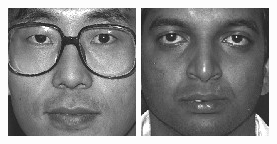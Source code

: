 \begin{figure}[ht]
\begin{center}
  \includegraphics[width=\columnwidth/10]{ch5/figures/feret9.jpg}
  \includegraphics[width=\columnwidth/10]{ch5/figures/feret10.jpg}

\end{center}
\end{figure}
